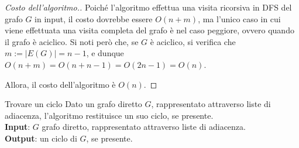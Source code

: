 \documentclass[a4paper, 12pt]{report}
\begin{document}
    \begin{proof}[Costo dell'algoritmo.]
        Poiché l'algoritmo effettua una visita ricorsiva in DFS del grafo $G$ in input, il costo dovrebbe essere $O(n + m)$, ma l'unico caso in cui viene effettuata una visita completa del grafo è nel caso peggiore, ovvero quando il grafo è aciclico. Si noti però che, se $G$ è aciclico, si verifica che $m := |E(G)| = n - 1$, e dunque $O(n + m) = O(n + n - 1) = O(2n - 1) = O(n)$.

        Allora, il costo dell'algoritmo è $O(n)$.
    \end{proof}

    \begin{framedalgo}[label={findCycleDir}, breakable]{Trovare un ciclo}
        Dato un grafo diretto $G$, rappresentato attraverso liste di adiacenza, l'algoritmo restituisce un suo ciclo, se presente.\\
        \textbf{Input}: $G$ grafo diretto, rappresentato attraverso liste di adiacenza.\\
        \textbf{Output}: un ciclo di $G$, se presente.


\end{framedalgo}
\end{document}
